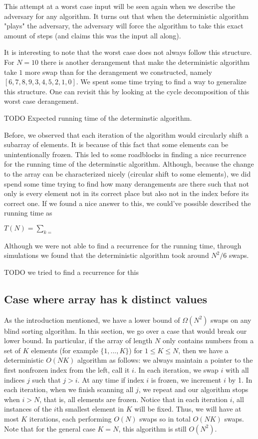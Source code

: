 \documentclass{article}
\begin{document}
This attempt at a worst case input will be seen again when we describe the adversary for any algorithm.
It turns out that when the deterministic algorithm "plays" the adversary, the adversary will force
the algorithm to take this exact amount of steps (and claims this was the input all along).

It is interesting to note that the worst case does not always follow this structure. For $N = 10$
there is another derangement that make the deterministic algorithm take $1$ more swap than for
the derangement we constructed, namely $[6, 7, 8, 9, 3, 4, 5, 2, 1, 0]$.
We spent some time trying to find a way to generalize this structure. One can revisit this by looking
at the cycle decomposition of this worst case derangement.

TODO Expected running time of the determinstic algorithm.

Before, we observed that each iteration of the algorithm would circularly shift a subarray of elements.
It is because of this fact that some elements can be unintentionally frozen. This led to some roadblocks
in finding a nice recurrence for the running time of the determinstic algorithm. Although, because the
change to the array can be characterized nicely (circular shift to some elements), we did spend some time
trying to find how many derangements are there such that not only is every element not in its correct place
but also not in the index before its correct one. If we found a nice answer to this, we could've possible
described the running time as 

$ T(N) = \sum_{k = }^{}{}$

Although we were not able to find a recurrence for the running time, through simulations we found that
the deterministic algorithm took around $N^2/6$ swaps.

TODO we tried to find a recurrence for this


\subsection{Case where array has k distinct values}
As the introduction mentioned, we have a lower bound of $\Omega(N^2)$ swaps on any blind sorting algorithm.
In this section,
we go over a case that would break our lower bound. In particular, if the array of length $N$ only
contains numbers from a set of $K$ elements (for example $\{1, ..., K\}$) for $ 1 \leq K \leq N $, then we have a 
deterministic $O(NK)$ algorithm as follows: we always maintain a pointer to the first nonfrozen index
from the left, call it $i$. In each iteration, we swap $i$ with all indices $j$ such that $j > i$. 
At any time if index $i$ is frozen, we increment $i$ by 1. In each iteration, when we finish scanning all $j$, we
repeat and our algorithm stops when $i > N$, that is, all elements are frozen.
Notice that in each iteration $i$, all instances of the $i$th smallest element in $K$ will be fixed.
Thus, we will have at most $K$ iterations, each performing $O(N)$ swaps so in total $O(NK)$ swaps.
Note that for the general case $K = N$, this algorithm is still $O(N^2)$.
\end{document}
